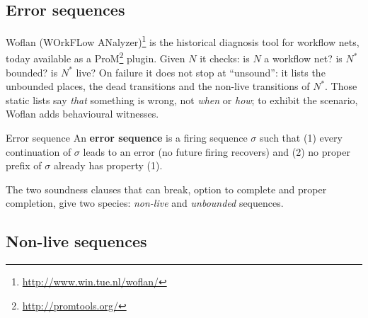 \subsection{Error sequences}

Woflan (WOrkFLow ANalyzer)\footnote{\url{http://www.win.tue.nl/woflan/}} is the historical diagnosis tool for workflow nets, today available as a ProM\footnote{\url{http://promtools.org/}} plugin. Given $N$ it checks: is $N$ a workflow net? is $N^{*}$ bounded? is $N^{*}$ live? On failure it does not stop at ``unsound'': it lists the unbounded places, the dead transitions and the non-live transitions of $N^{*}$. Those static lists say \emph{that} something is wrong, not \emph{when} or \emph{how}; to exhibit the scenario, Woflan adds behavioural witnesses.
\begin{definitionbox}{Error sequence}
An \textbf{error sequence} is a firing sequence $\sigma$ such that (1) every continuation of $\sigma$ leads to an error (no future firing recovers) and (2) no proper prefix of $\sigma$ already has property (1).
\end{definitionbox}
The two soundness clauses that can break, option to complete and proper completion, give two species: \emph{non-live} and \emph{unbounded} sequences.

\subsection{Non-live sequences}

